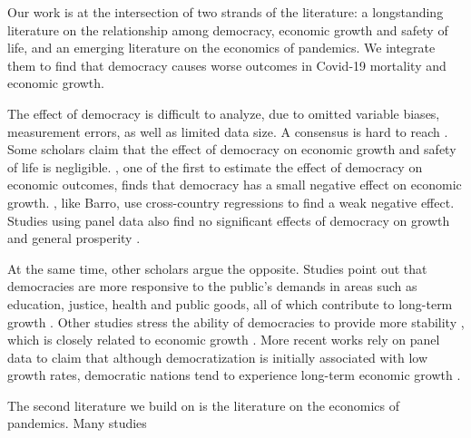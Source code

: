 Our work is at the intersection of two strands of the literature: a longstanding literature on the relationship among democracy, economic growth and safety of life, and an emerging literature on the economics of pandemics. We integrate them to find that democracy causes worse outcomes in Covid-19 mortality and economic growth. 

The effect of democracy is difficult to analyze, due to omitted variable biases, measurement errors, as well as limited data size. A consensus is hard to reach \citep{meta}. 
Some scholars claim that the effect of democracy on economic growth and safety of life is negligible. \citet{barro}, one of the first to estimate the effect of democracy on economic outcomes, finds that democracy has a small negative effect on economic growth. \citet{tavares}, like Barro, use cross-country regressions to find a weak negative effect. Studies using panel data also find no significant effects of democracy on growth and general prosperity \citep{burkhart, giavazzi}. 

At the same time, other scholars argue the opposite. Studies point out that democracies are more responsive to the public's demands in areas such as education, justice, health and public goods, all of which contribute to long-term growth \citep{edu-dem-growth, benabou, baum-lake2001, baum-lake2003, rodrik1998}. 
Other studies stress the ability of democracies to provide more stability \citep{sah}, which is closely related to economic growth \citep{quinn-woolley}. More recent works rely on panel data to claim that although democratization is initially associated with low growth rates, democratic nations tend to experience long-term economic growth \citep{dem-growth, ajr2014}.

The second literature we build on is the literature on the economics of pandemics. Many studies 


